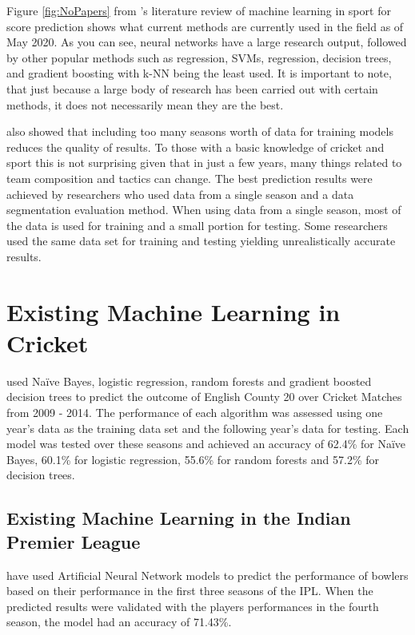 \documentclass[12pt,a4paper]{report}
\theoremstyle{definition}
\begin{document}
Figure \ref{fig:NoPapers} from \citet{horvat2020}'s literature review of machine learning in sport for score prediction shows what current methods are currently used in the field as of May 2020. 
As you can see, neural networks have a large research output, followed by other popular methods such as regression, SVMs, regression, decision trees, and gradient boosting with k-NN being the least used. 
It is important to note, that just because a large body of research has been carried out with certain methods, it does not necessarily mean they are the best. 

\citet{horvat2020} also showed that including too many seasons worth of data for training models reduces the quality of results. 
To those with a basic knowledge of cricket and sport this is not surprising given that in just a few years, many things related to team composition and tactics can change. 
The best prediction results were achieved by researchers who used data from a single season and a data segmentation evaluation method. 
When using data from a single season, most of the data is used for training and a small portion for testing. 
Some researchers used the same data set for training and testing yielding unrealistically accurate results.

\section{Existing Machine Learning in Cricket}

\citet{KampakisStylianos2015} used Naïve Bayes, logistic regression, random forests and gradient boosted decision trees to predict the outcome of English County 20 over Cricket Matches from 2009 - 2014. 
The performance of each algorithm was assessed using one year's data as the training data set and the following year's data for testing. 
Each model was tested over these seasons and achieved an accuracy of 62.4\% for Naïve Bayes, 60.1\% for logistic regression, 55.6\% for random forests and 57.2\% for decision trees.

\subsection{Existing Machine Learning in the Indian Premier League}

\citet{Saikia2012} have used Artificial Neural Network models to predict the performance of bowlers based on their performance in the first three seasons of the IPL. 
When the predicted results were validated with the players performances in the fourth season, the model had an accuracy of 71.43\%.
\end{document}
